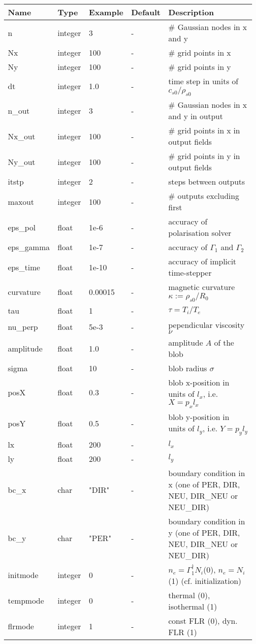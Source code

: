\begin{longtable}{llll>{\RaggedRight}p{7cm}}
\toprule
\rowcolor{gray!50}\textbf{Name} &  \textbf{Type} & \textbf{Example} & \textbf{Default} & \textbf{Description}  \\ \midrule
n      & integer & 3 & - &\# Gaussian nodes in x and y \\
Nx     & integer &100& - &\# grid points in x \\
Ny     & integer &100& - &\# grid points in y \\
dt     & integer &1.0& - &time step in units of $c_{s0}/\rho_{s0}$ \\
n\_out  & integer &3  & - &\# Gaussian nodes in x and y in output \\
Nx\_out & integer &100& - &\# grid points in x in output fields \\
Ny\_out & integer &100& - &\# grid points in y in output fields \\
itstp  & integer &2  & - &   steps between outputs \\
maxout & integer &100& - &      \# outputs excluding first \\
eps\_pol   & float &1e-6    & - &  accuracy of polarisation solver \\
eps\_gamma & float &1e-7    & - & accuracy of $\Gamma_1$ and $\Gamma_2$\\
eps\_time  & float &1e-10   & - & accuracy of implicit time-stepper \\
curvature  & float &0.00015& - & magnetic curvature $\kappa:=\rho_{s0}/R_0$ \\
tau        & float &1      & - & $\tau = T_i/T_e$  \\
nu\_perp    & float &5e-3   & - & pependicular viscosity $\nu$ \\
amplitude  & float &1.0    & - & amplitude $A$ of the blob \\
sigma      & float &10     & - & blob radius $\sigma$ \\
posX       & float &0.3    & - & blob x-position in units of $l_x$, i.e. $X = p_x l_x$\\
posY       & float &0.5    & - & blob y-position in units of $l_y$, i.e. $Y = p_y l_y$ \\
lx         & float &200    & - & $l_x$  \\
ly         & float &200    & - & $l_y$  \\
bc\_x   & char & "DIR"      & - & boundary condition in x (one of PER, DIR, NEU, DIR\_NEU or NEU\_DIR) \\
bc\_y   & char & "PER"      & - & boundary condition in y (one of PER, DIR, NEU, DIR\_NEU or NEU\_DIR) \\
initmode  & integer & 0 & - & \(n_e = \Gamma_1^\dagger N_i\)(0), \(n_e = N_i\) (1) (cf. initialization)\\
tempmode & integer & 0    & - &thermal (0), isothermal (1)\\
flrmode  & integer & 1    & - &const FLR (0), dyn. FLR (1)\\
\bottomrule
\end{longtable}

